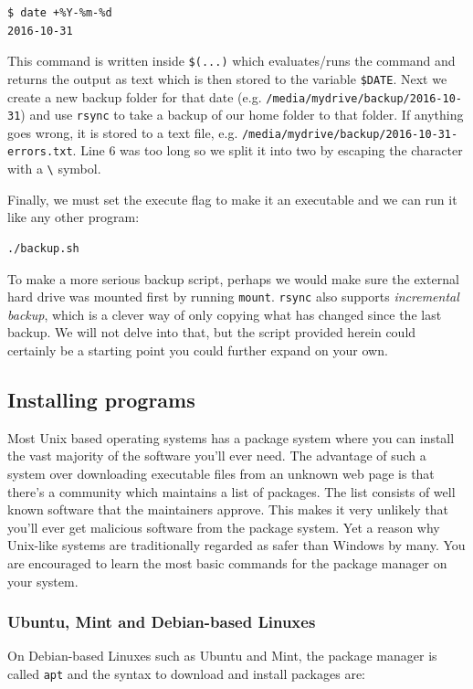 \begin{verbatim}
$ date +%Y-%m-%d
2016-10-31
\end{verbatim}
This command is written inside \verb|$(...)| which evaluates/runs the command and returns the output as text which is then stored to the variable \verb|$DATE|. Next we create a new backup folder for that date (e.g. \verb|/media/mydrive/backup/2016-10-31|) and use \verb|rsync| to take a backup of our home folder to that folder. If anything goes wrong, it is stored to a text file, e.g. \verb|/media/mydrive/backup/2016-10-31-errors.txt|. Line 6 was too long so we split it into two by escaping the character with a \verb|\| symbol.

Finally, we must set the execute flag to make it an executable and we can run it like any other program:
\begin{verbatim}
./backup.sh
\end{verbatim}

To make a more serious backup script, perhaps we would make sure the external hard drive was mounted first by running \verb|mount|. \verb|rsync| also supports \emph{incremental backup}, which is a clever way of only copying what has changed since the last backup. We will not delve into that, but the script provided herein could certainly be a starting point you could further expand on your own.

\subsection{Installing programs}
Most Unix based operating systems has a package system where you can install the vast majority of the software you'll ever need. The advantage of such a system over downloading executable files from an unknown web page is that there's a community which maintains a list of packages. The list consists of well known software that the maintainers approve. This makes it very unlikely that you'll ever get malicious software from the package system. Yet a reason why Unix-like systems are traditionally regarded as safer than Windows by many. You are encouraged to learn the most basic commands for the package manager on your system.

\subsubsection{Ubuntu, Mint and Debian-based Linuxes}
On Debian-based Linuxes such as Ubuntu and Mint, the package manager is called \verb|apt| and the syntax to download and install packages are:

